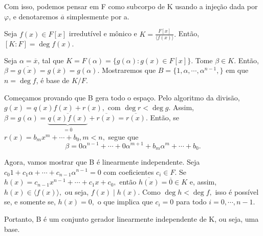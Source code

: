 \documentclass[algebraII_notes.tex]{subfiles}
\begin{document}
Com isso, podemos pensar em F como subcorpo de K usando a injeção dada por \(\varphi \), e denotaremos \(\overline{a}\) simplesmente por a.
\begin{prop*}
	Seja \(f(x)\in F[x]\) irredutível e mônico e \(K = \frac{F[x]}{\langle f(x) \rangle}.\) Então, \([K:F] = \deg{f(x)}.\)
\end{prop*}
\begin{proof*}
	Seja \(\alpha  = \overline{x}\), tal que \(K = F(\alpha ) = \{g(\alpha ): g(x)\in F[x]\}.\) Tome \(\beta \in K.\) Então,
	\(\beta = \overline{g(x)} = g(\overline{x}) = g(\alpha ).\) Mostraremos que \(B = \{1, \alpha , \cdots, \alpha ^{n-1},\}\) em que
	\(n=\deg{f}\), é base de \(K/F.\)

	Começamos provando que B gera todo o espaço. Pelo algoritmo da divisão, \(g(x) = q(x)f(x) + r(x),\) com \(\deg{r} < \deg{g}.\)
	Assim, \(\beta  = g(\alpha ) = \underbrace{\overline{q(x)f(x)}}_{=\overline{0}} + \overline{r(x)} = \overline{r(x)}\).
	Então, se \(r(x) = b_{m}x^{m} + \cdots + b_{0}, m < n,\) segue que
	\[
		\beta = 0\alpha ^{n-1} + \cdots + 0\alpha ^{m+1} + b_{m}\alpha ^{m} + \cdots + b_{0}.
	\]

	Agora, vamos mostrar que B é linearmente independente. Seja \(c_{0}1 + c_{1}\alpha + \cdots + c_{n-1}\alpha ^{n-1} = 0\) com coeficientes
	\(c_{i}\in F.\) Se \(h(x) = c_{n-1}x^{n-1} + \cdots + c_{1}x + c_{0},\) então \(\overline{h(x)} = \overline{0}\in K\) e, assim,
	\(h(x)\in \langle f(x) \rangle,\) ou seja, \(f(x)\mid h(x).\) Como \(\deg{h} < \deg{f}, \) isso é possível se, e somente se, \(h(x) = 0,\) o
	que implica que \(c_{i} = 0\) para todo \(i=0, \cdots, n-1\).

	Portanto, B é um conjunto gerador linearmente independente de K, ou seja, uma base. \qedsymbol
\end{proof*}
\end{document}
